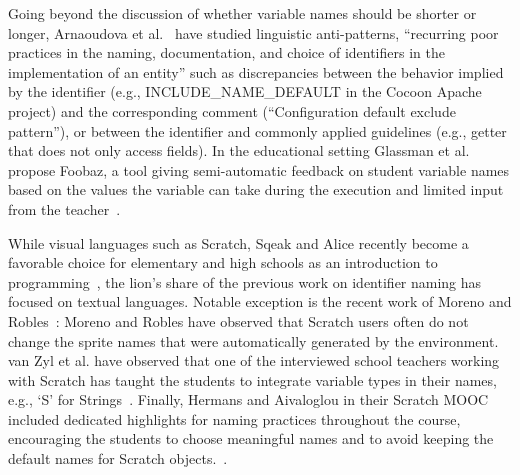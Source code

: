 \documentclass[conference]{IEEEtran}
\begin{document}
%

Going beyond the discussion of whether variable names should be shorter or longer, Arnaoudova et al.~\cite{ArnaoudovaPAG13,ArnaoudovaPA16} have studied linguistic anti-patterns, ``recurring poor practices in the naming, documentation, and choice of identifiers in the implementation of an entity'' such as discrepancies between the behavior implied by the identifier (e.g., {\sc INCLUDE\_NAME\_DEFAULT} in the Cocoon Apache project) and the corresponding comment (``Configuration default exclude pattern''), or between the identifier and commonly applied guidelines (e.g., getter that does not only access fields). 
In the educational setting Glassman et al. propose Foobaz, a tool giving semi-automatic feedback on student variable names based on the values the variable can take during the execution and limited input from the teacher~\cite{Glassman}.

While visual languages such as Scratch, Sqeak and Alice recently become a favorable choice for elementary and high schools as an introduction to programming~\cite{Matsuzawa}, the lion's share of the previous work on identifier naming has focused on textual languages.
Notable exception is the recent work of Moreno and Robles~\cite{MoreonoRobles}: Moreno and Robles have observed that Scratch users often do not change the sprite names that were automatically generated by the environment. 
van Zyl et al. have observed that one of the interviewed school teachers working with Scratch has taught the students to integrate variable types in their names, e.g., `S' for Strings~\cite{vanZyl}. Finally, Hermans and Aivaloglou in their Scratch MOOC included dedicated highlights for naming practices throughout the course, encouraging the students to choose meaningful names and to avoid keeping the default names for Scratch objects.~\cite{hermans_aivaloglou}. 
\end{document}

